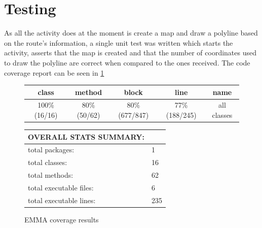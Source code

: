 \section{Testing}
As all the activity does at the moment is create a map and draw a polyline based on the route's information, a single unit test was written which starts the activity, asserts that the map is created and that the number of coordinates used to draw the polyline are correct when compared to the ones received. The code coverage report can be seen in \ref{tab:emma2}

\begin{figure}[ht]
\caption{EMMA coverage results}
\label{tab:emma2}
\begin{tabular}{| c | c | c | c | c |}
\hline
class & method & block & line & name \\ \hline
100\% (16/16) & 80\% (50/62) & 80\% (677/847) & 77\% (188/245) & all classes \\
\hline
\end{tabular}
\vspace{10pt}

\begin{tabular}{| l | l |}
\hline
OVERALL STATS SUMMARY: & \\ \hline
total packages: & 1 \\
total classes: & 16 \\
total methods: & 62 \\
total executable files: & 6 \\
total executable lines: & 235 \\
\hline
\end{tabular}
\end{figure}

